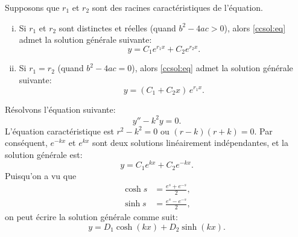 \begin{theorem}
	Supposons que $r_1$ et $r_2$ sont des racines caractéristiques de l'équation.
	\begin{enumerate}[(i)]
		\item Si $r_1$ et $r_2$ sont distinctes et réelles (quand $b^2 - 4ac > 0$),
				alors \eqref{ccsol:eq} admet la solution générale suivante: 
				\begin{equation*}
					y = C_1 e^{r_1 x} + C_2 e^{r_2 x} .
				\end{equation*}
		\item Si $r_1 = r_2$ (quand $b^2 - 4ac = 0$), alors \eqref{ccsol:eq} admet la solution générale suivante:
				\begin{equation*}
					y = (C_1 + C_2 x)\, e^{r_1 x} .
				\end{equation*}
	\end{enumerate}
\end{theorem}

\begin{example} \label{example:expsecondorder}
	Résolvons l'équation suivante:
	\begin{equation*}
		y'' - k^2 y = 0 .
	\end{equation*}
	L'équation caractéristique est $r^2 - k^2 = 0$ ou 
	$(r-k)(r+k) = 0$.  Par conséquent, $e^{-k x}$ et $e^{kx}$ sont deux solutions linéairement indépendantes, 
	et la solution générale est:  
	\begin{equation*}
		y = C_1 e^{kx} + C_2e^{-kx} .
	\end{equation*}
	Puisqu'on a vu que
	\begin{align*}
		\cosh s & = \frac{e^s+e^{-s}}{2}, \\
		\sinh s & = \frac{e^s-e^{-s}}{2},
	\end{align*}
	on peut écrire la solution générale comme suit:
	\begin{equation*}
		y = D_1 \cosh(kx) + D_2 \sinh(kx) .
	\end{equation*}
\end{example}

